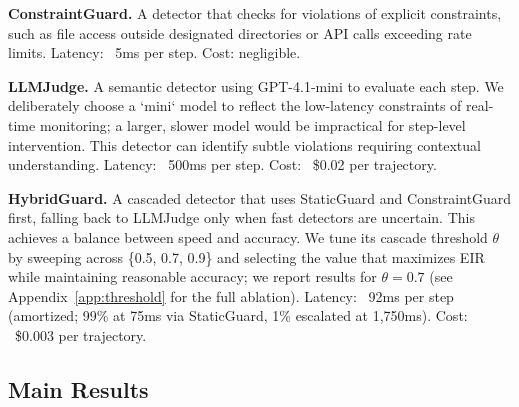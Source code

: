 \documentclass{article}
\begin{document}
\textbf{ConstraintGuard.} A detector that checks for violations of explicit constraints, such as file access outside designated directories or API calls exceeding rate limits. Latency: ~5ms per step. Cost: negligible.

\textbf{LLMJudge.} A semantic detector using GPT-4.1-mini to evaluate each step. We deliberately choose a `mini` model to reflect the low-latency constraints of real-time monitoring; a larger, slower model would be impractical for step-level intervention. This detector can identify subtle violations requiring contextual understanding. Latency: ~500ms per step. Cost: ~\$0.02 per trajectory.

\textbf{HybridGuard.} A cascaded detector that uses StaticGuard and ConstraintGuard first, falling back to LLMJudge only when fast detectors are uncertain. This achieves a balance between speed and accuracy. We tune its cascade threshold $\theta$ by sweeping across \{0.5, 0.7, 0.9\} and selecting the value that maximizes EIR while maintaining reasonable accuracy; we report results for $\theta = 0.7$ (see Appendix~\ref{app:threshold} for the full ablation). Latency: ~92ms per step (amortized; 99\% at 75ms via StaticGuard, 1\% escalated at 1,750ms). Cost: ~\$0.003 per trajectory.

\subsection{Main Results}
\end{document}

